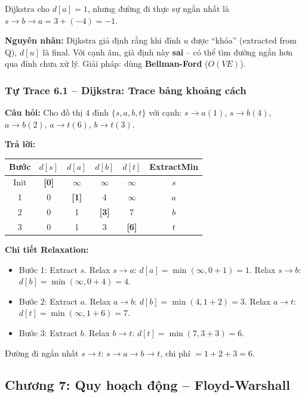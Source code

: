 \documentclass[10pt]{article}
\providecommand{\tightlist}{\setlength{\itemsep}{0pt}\setlength{\parskip}{0pt}}
\begin{document}
Dijkstra cho $d[a] = 1$, nhưng đường đi thực sự ngắn nhất là $s \to b \to a = 3 + (-4) = -1$.

\textbf{Nguyên nhân:} Dijkstra giả định rằng khi đỉnh $u$ được ``khóa'' (extracted from Q), $d[u]$ là final. Với cạnh âm, giả định này \textbf{sai} -- có thể tìm đường ngắn hơn qua đỉnh chưa xử lý. Giải pháp: dùng \textbf{Bellman-Ford} ($O(VE)$).

\subsubsection{Tự Trace 6.1 -- Dijkstra: Trace bảng khoảng cách}\label{traceans:6.1}

\textbf{Câu hỏi:} Cho đồ thị 4 đỉnh $\{s,a,b,t\}$ với cạnh: $s{\to}a(1)$, $s{\to}b(4)$, $a{\to}b(2)$, $a{\to}t(6)$, $b{\to}t(3)$.

\textbf{Trả lời:}

\begin{center}
\begin{tabular}{|c|c|c|c|c|c|}
\hline
\textbf{Bước} & $d[s]$ & $d[a]$ & $d[b]$ & $d[t]$ & \textbf{ExtractMin} \\
\hline
Init & \cellcolor{green!15}\textbf{[0]} & $\infty$ & $\infty$ & $\infty$ & $s$ \\
\hline
1 & 0 & \cellcolor{green!15}\textbf{[1]} & 4 & $\infty$ & $a$ \\
\hline
2 & 0 & 1 & \cellcolor{green!15}\textbf{[3]} & 7 & $b$ \\
\hline
3 & 0 & 1 & 3 & \cellcolor{green!15}\textbf{[6]} & $t$ \\
\hline
\end{tabular}
\end{center}

\textbf{Chi tiết Relaxation:}
\begin{itemize}
\tightlist
\item Bước 1: Extract $s$. Relax $s{\to}a$: $d[a]=\min(\infty, 0+1)=1$. Relax $s{\to}b$: $d[b]=\min(\infty, 0+4)=4$.
\item Bước 2: Extract $a$. Relax $a{\to}b$: $d[b]=\min(4, 1+2)=3$. Relax $a{\to}t$: $d[t]=\min(\infty, 1+6)=7$.
\item Bước 3: Extract $b$. Relax $b{\to}t$: $d[t]=\min(7, 3+3)=6$.
\end{itemize}

Đường đi ngắn nhất $s \to t$: $s \to a \to b \to t$, chi phí $= 1 + 2 + 3 = \boxed{6}$.

\subsection{Chương 7: Quy hoạch động -- Floyd-Warshall}
\end{document}
